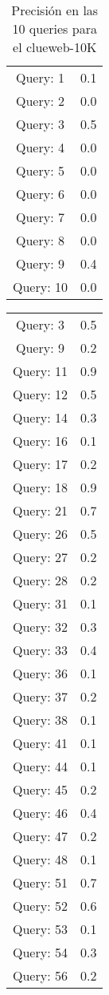 \begin{table}[hbtp]
\centering
\begin{tabular}{cc}
Query: 1&0.1
\\
Query: 2&0.0
\\
Query: 3&0.5
\\
Query: 4&0.0
\\
Query: 5&0.0
\\
Query: 6&0.0
\\
Query: 7&0.0
\\
Query: 8&0.0
\\
Query: 9&0.4
\\
Query: 10&0.0
\\
\end{tabular}
\caption{Precisi\'{o}n en las 10 queries para el clueweb-10K}
\end{table}
\begin{table}[hbtp]
\centering
\begin{tabular}{cc}
Query: 3&0.5
\\
Query: 9&0.2
\\
Query: 11&0.9
\\
Query: 12&0.5
\\
Query: 14&0.3
\\
Query: 16&0.1
\\
Query: 17&0.2
\\
Query: 18&0.9
\\
Query: 21&0.7
\\
Query: 26&0.5
\\
Query: 27&0.2
\\
Query: 28&0.2
\\
Query: 31&0.1
\\
Query: 32&0.3
\\
Query: 33&0.4
\\
Query: 36&0.1
\\
Query: 37&0.2
\\
Query: 38&0.1
\\
Query: 41&0.1
\\
Query: 44&0.1
\\
Query: 45&0.2
\\
Query: 46&0.4
\\
Query: 47&0.2
\\
Query: 48&0.1
\\
Query: 51&0.7
\\
Query: 52&0.6
\\
Query: 53&0.1
\\
Query: 54&0.3
\\
Query: 56&0.2
\\

\end{tabular}
\end{table}
